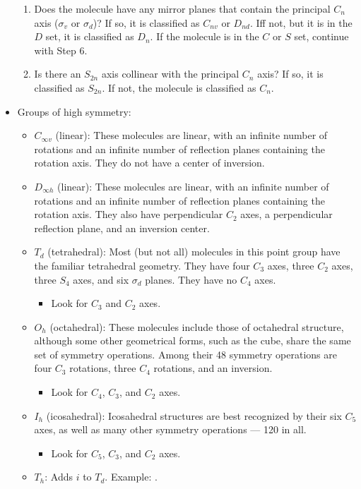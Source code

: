 \documentclass[../main.tex]{subfiles}
\begin{document}
\begin{itemize}
\begin{enumerate}
        \item Does the molecule have any mirror planes that contain the principal $C_n$ axis ($\sigma_v$ or $\sigma_d$)? If so, it is classified as $C_{nv}$ or $D_{nd}$. Iff not, but it is in the $D$ set, it is classified as $D_n$. If the molecule is in the $C$ or $S$ set, continue with Step 6.
        \item Is there an $S_{2n}$ axis collinear with the principal $C_n$ axis? If so, it is classified as $S_{2n}$. If not, the molecule is classified as $C_n$.
    \end{enumerate}
    \item Groups of high symmetry:
    \begin{itemize}
        \item $C_{\infty v}$ (linear): These molecules are linear, with an infinite number of rotations and an infinite number of reflection planes containing the rotation axis. They do not have a center of inversion.
        \item $D_{\infty h}$ (linear): These molecules are linear, with an infinite number of rotations and an infinite number of reflection planes containing the rotation axis. They also have perpendicular $C_2$ axes, a perpendicular reflection plane, and an inversion center.
        \item $T_d$ (tetrahedral): Most (but not all) molecules in this point group have the familiar tetrahedral geometry. They have four $C_3$ axes, three $C_2$ axes, three $S_4$ axes, and six $\sigma_d$ planes. They have no $C_4$ axes.
        \begin{itemize}
            \item Look for $C_3$ and $C_2$ axes.
        \end{itemize}
        \item $O_h$ (octahedral): These molecules include those of octahedral structure, although some other geometrical forms, such as the cube, share the same set of symmetry operations. Among their 48 symmetry operations are four $C_3$ rotations, three $C_4$ rotations, and an inversion.
        \begin{itemize}
            \item Look for $C_4$, $C_3$, and $C_2$ axes.
        \end{itemize}
        \item $I_h$ (icosahedral): Icosahedral structures are best recognized by their six $C_5$ axes, as well as many other symmetry operations --- 120 in all.
        \begin{itemize}
            \item Look for $C_5$, $C_3$, and $C_2$ axes.
        \end{itemize}
        \item $T_h$: Adds $i$ to $T_d$. Example: .
    \end{itemize}
\end{itemize}
\end{document}
